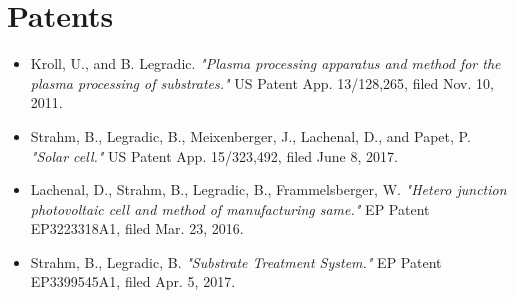\documentclass[verylight]{simplehipstercv}
\begin{document}
\section*{Patents}
\begin{itemize}
    \item Kroll, U., and B. Legradic. \textit{"Plasma processing apparatus and method for the plasma processing of substrates."} US Patent App. 13/128,265, filed Nov. 10, 2011.
    \item Strahm, B., Legradic, B., Meixenberger, J., Lachenal, D., and Papet, P. \textit{"Solar cell."} US Patent App. 15/323,492, filed June 8, 2017.
    \item Lachenal, D., Strahm, B., Legradic, B., Frammelsberger, W. \textit{"Hetero junction photovoltaic cell and method of manufacturing same."} EP Patent EP3223318A1, filed Mar. 23, 2016.
    \item Strahm, B., Legradic, B. \textit{"Substrate Treatment System."} EP Patent EP3399545A1, filed Apr. 5, 2017.
\end{itemize}
\end{document}
